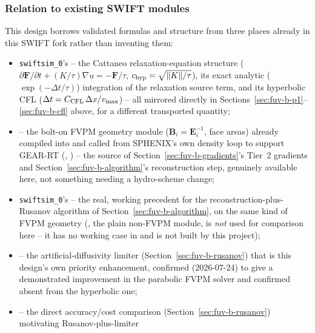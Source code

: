 \subsubsection{Relation to existing SWIFT modules}
\label{sec:fuv-b-precedent}

This design borrows validated formulas and structure from three places
already in this SWIFT fork rather than inventing them:
\begin{itemize}
  \item \texttt{swiftsim\_0}'s 
    -- the Cattaneo relaxation-equation structure
    ($\partial\mathbf F/\partial t + (K/\tau)\nabla u=-\mathbf F/\tau$,
    $c_{\rm hyp}=\sqrt{\|K\|/\tau}$), its exact analytic
    ($\exp(-\Delta t/\tau)$) integration of the relaxation source term,
    and its hyperbolic CFL ($\Delta t=C_{\rm CFL}\,\Delta x/v_{\max}$) --
    all mirrored directly in Sections~\ref{sec:fuv-b-p1}--\ref{sec:fuv-b-cfl}
    above, for a different transported quantity;
  \item {} -- the bolt-on FVPM geometry
    module ($\mathbf B_i=\mathbf E_i^{-1}$, face areas) already compiled
    into and called from SPHENIX's own density loop to support GEAR-RT
    (,
    ) -- the source of
    Section~\ref{sec:fuv-b-gradients}'s Tier~2 gradients and
    Section~\ref{sec:fuv-b-algorithm}'s reconstruction step, genuinely
    available here, not something needing a hydro-scheme change;
  \item \texttt{swiftsim\_0}'s 
    -- the real, working precedent for the reconstruction-plus-Rusanov
    algorithm of Section~\ref{sec:fuv-b-algorithm}, on the same kind of
    FVPM geometry (, the plain
    non-FVPM module, is \emph{not} used for comparison here -- it has
    no working  case in  and
    is not built by this project);
  \item \citet{Hopkins2017diffusion} -- the artificial-diffusivity
    limiter (Section~\ref{sec:fuv-b-rusanov}) that is this design's own
    priority enhancement, confirmed (2026-07-24) to give a demonstrated
    improvement in the parabolic FVPM solver and confirmed absent from
    the hyperbolic one;
  \item \citet{Rosswog2026} -- the direct accuracy/cost comparison
    (Section~\ref{sec:fuv-b-rusanov}) motivating Rusanov-plus-limiter

\end{itemize}
